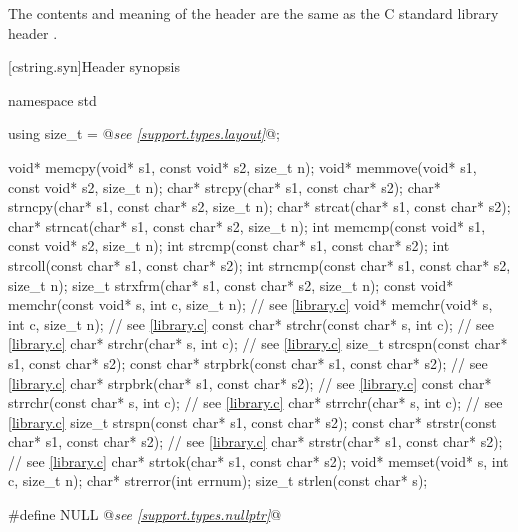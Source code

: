 \pnum
The contents and meaning of the header 
are the same as the C standard library header .


[cstring.syn]{Header  synopsis}

%
%
%
%
%
%
%
%
%
%
%
%
%
%
%
%
%
%
%
%
%
%
%
\begin{codeblock}
namespace std {
  using size_t = @\textit{see \ref{support.types.layout}}@;

  void* memcpy(void* s1, const void* s2, size_t n);
  void* memmove(void* s1, const void* s2, size_t n);
  char* strcpy(char* s1, const char* s2);
  char* strncpy(char* s1, const char* s2, size_t n);
  char* strcat(char* s1, const char* s2);
  char* strncat(char* s1, const char* s2, size_t n);
  int memcmp(const void* s1, const void* s2, size_t n);
  int strcmp(const char* s1, const char* s2);
  int strcoll(const char* s1, const char* s2);
  int strncmp(const char* s1, const char* s2, size_t n);
  size_t strxfrm(char* s1, const char* s2, size_t n);
  const void* memchr(const void* s, int c, size_t n);           // see \ref{library.c}
  void* memchr(void* s, int c, size_t n);                       // see \ref{library.c}
  const char* strchr(const char* s, int c);                     // see \ref{library.c}
  char* strchr(char* s, int c);                                 // see \ref{library.c}
  size_t strcspn(const char* s1, const char* s2);
  const char* strpbrk(const char* s1, const char* s2);          // see \ref{library.c}
  char* strpbrk(char* s1, const char* s2);                      // see \ref{library.c}
  const char* strrchr(const char* s, int c);                    // see \ref{library.c}
  char* strrchr(char* s, int c);                                // see \ref{library.c}
  size_t strspn(const char* s1, const char* s2);
  const char* strstr(const char* s1, const char* s2);           // see \ref{library.c}
  char* strstr(char* s1, const char* s2);                       // see \ref{library.c}
  char* strtok(char* s1, const char* s2);
  void* memset(void* s, int c, size_t n);
  char* strerror(int errnum);
  size_t strlen(const char* s);
}

#define NULL @\textit{see \ref{support.types.nullptr}}@
\end{codeblock}

